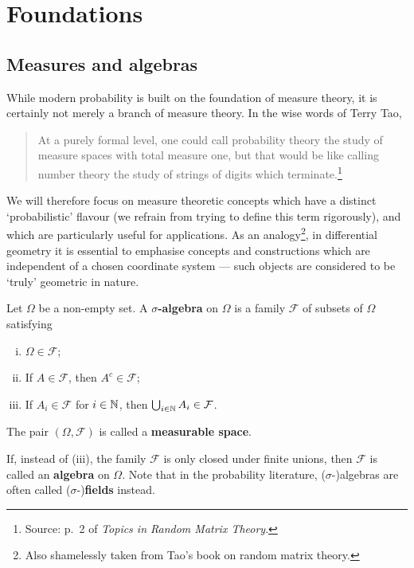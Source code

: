 \section{Foundations}

\subsection{Measures and algebras}
While modern probability is built on the foundation of measure theory, it is certainly not merely a branch of measure theory. In the wise words of Terry Tao,
\begin{quote}
    At a purely formal level, one could call probability theory the study of measure spaces with total measure one, but that would be like calling number theory the study of strings of digits which terminate.\footnote{ Source: p.\ 2 of \emph{Topics in Random Matrix Theory}.}
\end{quote}
We will therefore focus on measure theoretic concepts which have a distinct `probabilistic' flavour (we refrain from trying to define this term rigorously), and which are particularly useful for applications. As an analogy\footnote{ Also shamelessly taken from Tao's book on random matrix theory.}, in differential geometry it is essential to emphasise concepts and constructions which are independent of a chosen coordinate system --- such objects are considered to be `truly' geometric in nature.

\begin{definition}
    Let $\Omega$ be a non-empty set. A \textbf{$\sigma$-algebra} on $\Omega$ is a family $\mathcal{F}$ of subsets of $\Omega$ satisfying
    \begin{enumerate}[(i)]
        \item $\Omega\in\mathcal{F}$;
        \item If $A\in\mathcal{F}$, then $A^c\in\mathcal{F}$;
        \item If $A_i \in\mathcal{F}$ for $i\in\mathbb{N}$, then $\bigcup_{i\in\mathbb{N}}A_i \in\mathcal{F}$.
    \end{enumerate}
    The pair $(\Omega,\mathcal{F})$ is called a \textbf{measurable space}.

    If, instead of (iii), the family $\mathcal{F}$ is only closed under finite unions, then $\mathcal{F}$ is called an \textbf{algebra} on $\Omega$. Note that in the probability literature, ($\sigma$-)algebras are often called ($\sigma$-)\textbf{fields} instead.
\end{definition}

